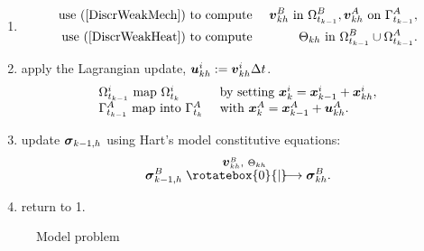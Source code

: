 \documentclass[12pt,a4paper]{scrbook}
\begin{document}
\begin{minipage}[b]{17cm}
\begin{enumerate}
\item 
\begin{minipage}[l]{10cm}
\begin{eqnarray}\nonumber
\mbox{use }(\ref{DiscrWeakMech})  & \mbox{ to compute }& \mbox{\boldmath$v$}^{B}_{kh} \mbox{ in }\Omega^{B}_{t_{k-1}},  \mbox{\boldmath$v$}^{A}_{kh} \mbox{ on }\Gamma^{A}_{t_{k-1}},
\\
\mbox{use }(\ref{DiscrWeakHeat})  &\mbox{ to compute }&\Theta_{kh}\mbox{ in } \Omega^{B}_{t_{k-1}}\cup\Omega^{A}_{t_{k-1}}.\nonumber
\end{eqnarray}
\end{minipage}
\item apply the Lagrangian update, $\mbox{\boldmath$u$}^i_{kh}:=\mbox{\boldmath$v$}^{i}_{kh}\Delta t$.
\begin{equation}\nonumber
\begin{array}{ll}
\Omega^i_{t_{k-1}}\mbox{ map }  \Omega^i_{t_{k}} &\mbox{ by setting }  \mbox{\boldmath$x$}_k^i=\mbox{\boldmath$x$}^i_{k-1}+\mbox{\boldmath$x$}^i_{kh}, \\
\Gamma^{A}_{t_{k-1}}\mbox{ map into }  \Gamma^{A}_{t_{k}} &\mbox{  with } \mbox{\boldmath$x$}_k^{A}=\mbox{\boldmath$x$}^{A}_{k-1}+\mbox{\boldmath$u$}^{A}_{kh}. \\
\end{array}
\end{equation}
\item {} update  $\mbox{\boldmath$\sigma$}_{k-1,h}$ using Hart's model constitutive equations: \\  \begin{equation}\nonumber
\bv{\sigma}^{\sl}_{k-1,h}\stackrel{\bv{v}^{\sl}_{kh},~\Theta_{kh}}{\rotatebox{0}{|}\!\!\!\!\longrightarrow}\bv{\sigma}^{\sl}_{kh}.
\end{equation}

\item return to 1.
\end{enumerate}
\end{minipage}

\begin{figure}
\begin{center}
\begin{minipage}[c]{8.5cm}
\caption{Model problem}\label{fig:MetalChipingModelProblem}
\end{minipage}
\end{center}
\end{figure}
\end{document}

